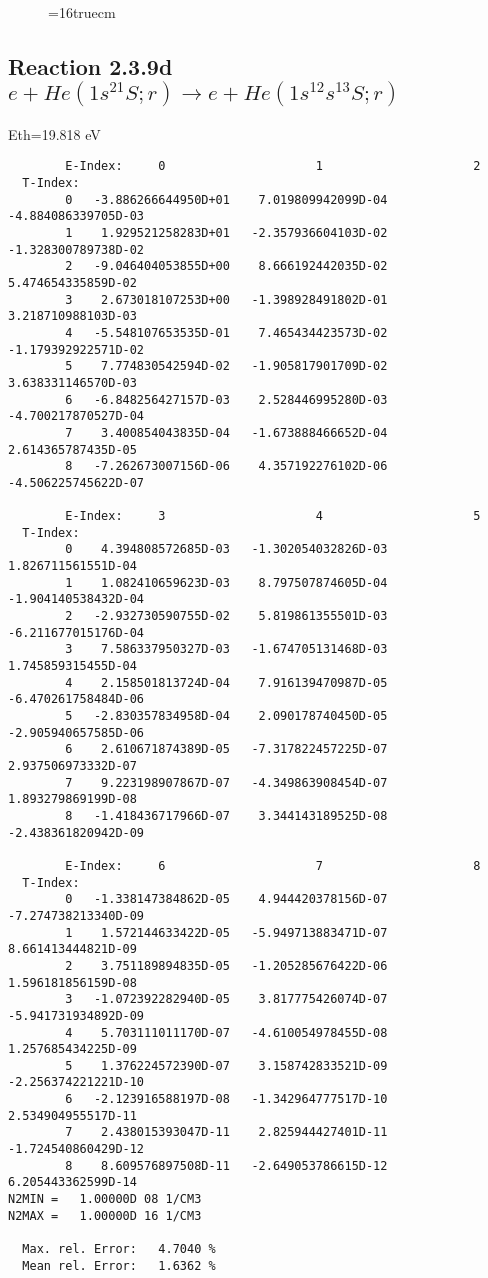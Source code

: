 \documentclass[12pt,dvipdfmx]{article}
\begin{document}
\begin{figure} \label{2.3.9c}
\epsfxsize=16truecm
\end{figure}
\newpage

\subsection{
Reaction 2.3.9d $ e + He(1s^21S;r) \rightarrow e + He(1s^12s^13S;r) $
}
Eth=19.818 eV



\begin{small}\begin{verbatim}
        E-Index:     0                     1                     2
  T-Index:
        0   -3.886266644950D+01    7.019809942099D-04   -4.884086339705D-03
        1    1.929521258283D+01   -2.357936604103D-02   -1.328300789738D-02
        2   -9.046404053855D+00    8.666192442035D-02    5.474654335859D-02
        3    2.673018107253D+00   -1.398928491802D-01    3.218710988103D-03
        4   -5.548107653535D-01    7.465434423573D-02   -1.179392922571D-02
        5    7.774830542594D-02   -1.905817901709D-02    3.638331146570D-03
        6   -6.848256427157D-03    2.528446995280D-03   -4.700217870527D-04
        7    3.400854043835D-04   -1.673888466652D-04    2.614365787435D-05
        8   -7.262673007156D-06    4.357192276102D-06   -4.506225745622D-07

        E-Index:     3                     4                     5
  T-Index:
        0    4.394808572685D-03   -1.302054032826D-03    1.826711561551D-04
        1    1.082410659623D-03    8.797507874605D-04   -1.904140538432D-04
        2   -2.932730590755D-02    5.819861355501D-03   -6.211677015176D-04
        3    7.586337950327D-03   -1.674705131468D-03    1.745859315455D-04
        4    2.158501813724D-04    7.916139470987D-05   -6.470261758484D-06
        5   -2.830357834958D-04    2.090178740450D-05   -2.905940657585D-06
        6    2.610671874389D-05   -7.317822457225D-07    2.937506973332D-07
        7    9.223198907867D-07   -4.349863908454D-07    1.893279869199D-08
        8   -1.418436717966D-07    3.344143189525D-08   -2.438361820942D-09

        E-Index:     6                     7                     8
  T-Index:
        0   -1.338147384862D-05    4.944420378156D-07   -7.274738213340D-09
        1    1.572144633422D-05   -5.949713883471D-07    8.661413444821D-09
        2    3.751189894835D-05   -1.205285676422D-06    1.596181856159D-08
        3   -1.072392282940D-05    3.817775426074D-07   -5.941731934892D-09
        4    5.703111011170D-07   -4.610054978455D-08    1.257685434225D-09
        5    1.376224572390D-07    3.158742833521D-09   -2.256374221221D-10
        6   -2.123916588197D-08   -1.342964777517D-10    2.534904955517D-11
        7    2.438015393047D-11    2.825944427401D-11   -1.724540860429D-12
        8    8.609576897508D-11   -2.649053786615D-12    6.205443362599D-14
N2MIN =   1.00000D 08 1/CM3
N2MAX =   1.00000D 16 1/CM3

  Max. rel. Error:   4.7040 %
  Mean rel. Error:   1.6362 %



\end{verbatim}\end{small}
\end{document}
